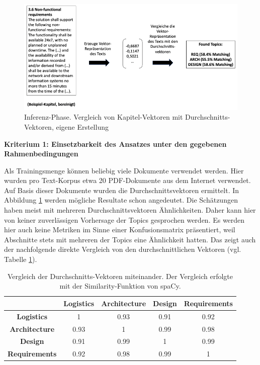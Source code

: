 \begin{figure}[h]
\centering
\includegraphics[scale=0.95]{content/pics/Picture_17.png}
\caption{Inferenz-Phase. Vergleich von Kapitel-Vektoren mit Durchschnitts-Vektoren, eigene Erstellung}
\label{Abbildung:avgvec2}
\end{figure}

{\bf Kriterium 1: Einsetzbarkeit des Ansatzes unter den gegebenen Rahmenbedingungen}

Als Trainingsmenge können beliebig viele Dokumente verwendet werden. Hier wurden pro Text-Korpus etwa 20 PDF-Dokumente aus dem Internet verwendet. Auf Basis dieser Dokumente wurden die Durchschnittsvektoren ermittelt. 
In Abbildung \ref{Abbildung:avgvec2} werden mögliche Resultate schon angedeutet. Die Schätzungen haben meist mit mehreren Durchschnittsvektoren Ähnlichkeiten. Daher kann hier von keiner zuverlässigen Vorhersage der Topics gesprochen werden. 
Es werden hier auch keine Metriken im Sinne einer Konfusionsmatrix präsentiert, weil Abschnitte stets mit mehreren der Topics eine Ähnlichkeit hatten. Das zeigt auch der nachfolgende direkte Vergleich von den durchschnittlichen Vektoren (vgl. Tabelle \ref{table:4}).

\begin{table}[h]
\centering
\begin{tabular}{|c|c|c|c|c|}
\hline
                      & \textbf{Logistics} & \textbf{Architecture} & \textbf{Design} & \textbf{Requirements} \\ \hline
\textbf{Logistics}    & 1                  & 0.93                  & 0.91            & 0.92                  \\ \hline
\textbf{Architecture} & 0.93               & 1                     & 0.99            & 0.98                  \\ \hline
\textbf{Design}       & 0.91               & 0.99                  & 1               & 0.99                  \\ \hline
\textbf{Requirements} & 0.92               & 0.98                  & 0.99            & 1                     \\ \hline
\end{tabular}
\caption{Vergleich der Durchschnitts-Vektoren miteinander. Der Vergleich erfolgte mit der Similarity-Funktion von spaCy.}
\label{table:4}
\end{table}

